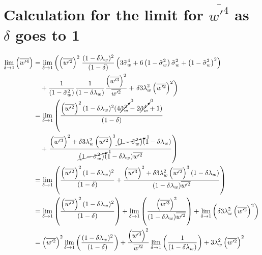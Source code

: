 \section{Calculation for the limit for \texorpdfstring{$\overline{w'^4}$}{wprime4bar} as \texorpdfstring{$\delta$}{delta} goes to 1}
\label{sec:calculation-for-the-limit-for-wprime4bar-as-delta-goes-to-1}

{\allowdisplaybreaks
    \begin{align}
        \label{eq:limit_wprime4_delta_to_1_calc}
        \lim_{\delta \to 1}\left(\overline{w'^4}\right)
        &= \lim_{\delta \to 1}
        \left(\left(\overline{w'^2}\right)^2\right.
        \frac{(1-\delta \lambda_w)^2}{(1-\delta)}
        \left(3 \tilde{\sigma}_w^4 + 6 \left( 1 - \tilde{\sigma}_w^2 \right) \tilde{\sigma}_w^2 + \left( 1 - \tilde{\sigma}_w^2 \right)^2\right) \nonumber\\
        &\quad+ \frac{1}{\left( 1 - \tilde{\sigma}_w^2 \right)} \frac{1}{(1-\delta \lambda_w)}
        \frac{\left(\overline{w'^3}\right)^2}{\overline{w'^2}}
        + \left.\delta 3 \lambda_w^2 \left(\overline{w'^2}\right)^2\right) \\
        &= \lim_{\delta \to 1}
        \left(
        \frac{
            \left(\overline{w'^2}\right)^2 (1-\delta \lambda_w)^2
            (4 \cancelto{0}{\tilde{\sigma}_w^2} - 2 \cancelto{0}{\tilde{\sigma}_w^4} + 1)
        }
        {(1-\delta)}
        \right.
        \nonumber\\
        &\quad+ \left.
        \frac{
            \left(\overline{w'^3}\right)^2 +
            \delta 3 \lambda_w^2 \left(\overline{w'^2}\right)^3 \cancelto{1}{\left( 1 - \tilde{\sigma}_w^2 \right)} (1-\delta \lambda_w)
        }
        {
            \cancelto{1}{\left( 1 - \tilde{\sigma}_w^2 \right)} (1-\delta \lambda_w) \overline{w'^2}
        }
        \right)
        \\
        &= \lim_{\delta \to 1}
        \left(
        \frac{\left(\overline{w'^2}\right)^2 (1-\delta \lambda_w)^2}{(1-\delta)} +
        \frac{
            \left(\overline{w'^3}\right)^2 +
            \delta 3 \lambda_w^2 \left(\overline{w'^2}\right)^3
            (1-\delta \lambda_w)
        }{(1-\delta \lambda_w)\overline{w'^2}}
        \right)
        \\
        &= \lim_{\delta \to 1}
        \left(
        \frac{\left(\overline{w'^2}\right)^2 (1-\delta \lambda_w)^2}{(1-\delta)}
        \right) +
        \lim_{\delta \to 1}
        \left(
        \frac{\left(\overline{w'^3}\right)^2}{(1-\delta \lambda_w)\overline{w'^2}}
        \right) +
        \lim_{\delta \to 1}
        \left(
        \delta 3 \lambda_w^2 \left(\overline{w'^2}\right)^2
        \right)
        \\
        &=
        \left(\overline{w'^2}\right)^2 \lim_{\delta \to 1} \left(\frac{ (1-\delta \lambda_w)^2}{(1-\delta)}\right) +
        \frac{\left(\overline{w'^3}\right)^2}{\overline{w'^2}} \lim_{\delta \to 1}\left(\frac{1}{(1-\delta \lambda_w)} \right) +
        3 \lambda_w^2 \left(\overline{w'^2}\right)^2
    \end{align}
}

